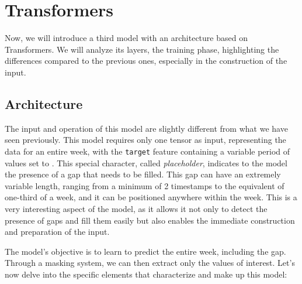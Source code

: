 \section{Transformers}\label{sec:gab}
Now, we will introduce a third model with an architecture based on Transformers\cite{attention}.
We will analyze its layers, the training phase, highlighting the differences
compared to the previous ones, especially in the construction of the input.


\subsection{Architecture}
The input and operation of this model are slightly different
from what we have seen previously.
This model requires only one tensor as input, representing the data for an entire week, with the \verb|target| feature containing a variable period of values set to . This special character, called \textit{placeholder}, indicates to the model the presence of a gap that needs to be filled. %
This gap can have an extremely variable length,
ranging from a minimum of 2 timestamps to the equivalent
of one-third of a week, and it can be positioned anywhere within the week.
This is a very interesting aspect of the model, as it allows it not only to detect the presence of gaps and fill them easily but also enables the immediate construction and preparation of the input.

The model's objective is to learn to predict the entire week, including the gap.
Through a masking system, we can then extract only the values of interest.
Let's now delve into the specific elements that characterize and make up this model:


